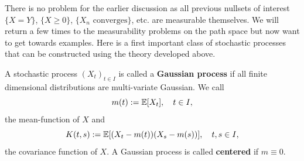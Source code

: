 There is no problem for the earlier discussion as all previous nullsets of interest $\{X=Y\}$, $\{X\geq 0\}$, $\{X_n \text{ converges}\}$, etc. are measurable themselves. We will return a few times to the measurability problems on the path space but now want to get towards examples. Here is a first important class of stochastic processes that can be constructed using the theory developed above.
\begin{ldef}
	\begin{deff}
		A stochastic process $(X_t)_{t\in I}$ is called a \textbf{Gaussian process} if all finite dimensional distributions are multi-variate Gaussian. We call $$m(t):=\mathbb{E}[X_t],\quad t\in I,$$ the mean-function of $X$ and $$K(t,s):=\mathbb{E}[(X_t-m(t))(X_s-m(s))],\quad t,s\in I,$$ the covariance function of $X$. A Gaussian process is called \textbf{centered} if $m\equiv 0$.
	\end{deff}
\end{ldef}
